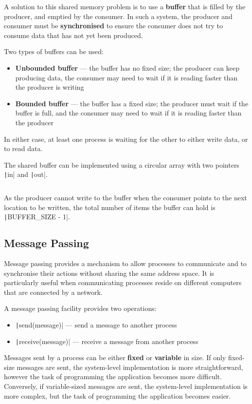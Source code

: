 \documentclass{article}
\begin{document}
A solution to this shared memory problem is to use a \textbf{buffer}
that is filled by the producer, and emptied by the consumer. In such a
system, the producer and consumer must be \textbf{synchronised} to
ensure the consumer does not try to consume data that has not yet been
produced.

Two types of buffers can be used:
\begin{itemize}
    \item \textbf{Unbounded buffer} --- the buffer has no fixed size;
          the producer can keep producing data, the consumer may need
          to wait if it is reading faster than the producer is writing
    \item \textbf{Bounded buffer} --- the buffer has a fixed size; the
          producer must wait if the buffer is full, and the consumer
          may need to wait if it is reading faster than the producer
\end{itemize}
In either case, at least one process is waiting for the other to either
write data, or to read data.

The shared buffer can be implemented using a circular array with two
pointers \texttt|in| and \texttt|out|.
\inputminted{c}{code/shared_memory.c} As the producer cannot write to
the buffer when the consumer points to the next location to be written,
the total number of items the buffer can hold is
\texttt|BUFFER_SIZE - 1|. %
\subsection{Message Passing}
Message passing provides a mechanism to allow processes to communicate
and to synchronise their actions without sharing the same address
space. It is particularly useful when communicating processes reside on
different computers that are connected by a network.

A message passing facility provides two operations:
\begin{itemize}
    \item \texttt|send(message)| --- send a message to another
          process
    \item \texttt|receive(message)| --- receive a message from
          another process
\end{itemize}
Messages sent by a process can be either \textbf{fixed} or
\textbf{variable} in size. If only fixed-size messages are sent, the
system-level implementation is more straightforward, however the task
of programming the application becomes more difficult. Conversely, if
variable-sized messages are sent, the system-level implementation is
more complex, but the task of programming the application becomes
easier.
\end{document}
